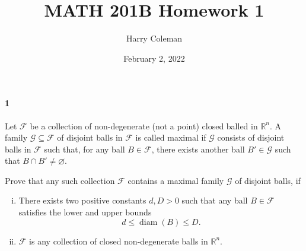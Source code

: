 \documentclass[12pt]{article}
\renewcommand{\maketitle}{\thispagestyle{title}}
\newlength{\myparskip}
\newenvironment{fullbox}{\begin{lrbox}{\savefullbox}\begin{minipage}{\dimexpr\textwidth-2\fboxsep\relax}\setlength{\parskip}{\myparskip}}{\end{minipage}\end{lrbox}\framebox[\textwidth]{\usebox{\savefullbox}}}
\newenvironment{pbox}[1][]{\begin{fullbox}\ifx#1\empty\else\paragraph{#1}\phantom{}\fi}{\end{fullbox}}
\theoremstyle{definition}
\newcommand{\R}{\mathbb{R}}
\renewcommand{\emptyset}{\varnothing}
\newcommand{\<}{\langle}
\renewcommand{\>}{\rangle}
\newcommand{\seq}{\subseteq}
\newcommand{\FF}{\mathcal{F}}
\newcommand{\GG}{\mathcal{G}}
\DeclareMathOperator{\diam}{diam}
\begin{document}
\title{MATH 201B Homework 1}
\author{Harry Coleman}
\date{February 2, 2022}
\maketitle

\begin{pbox}[1]
    Let $\FF$ be a collection of non-degenerate (not a point) closed balled in $\R^n$.
    A family $\GG \seq \FF$ of disjoint balls in $\FF$ is called maximal if $\GG$ consists of disjoint balls in $\FF$ such that, for any ball $B \in \FF$, there exists another ball $B' \in \GG$ such that $B \cap B' \ne \emptyset$.

    Prove that any such collection $\FF$ contains a maximal family $\GG$ of disjoint balls, if
    \begin{enumerate}[(i)]
        \item There exists two positive constants $d, D > 0$ such that any ball $B \in \FF$ satisfies the lower and upper bounds
        \[
            d \leq \diam(B) \leq D.
        \]
        \item $\FF$ is any collection of closed non-degenerate balls in $\R^n$.
    \end{enumerate}

    
\end{pbox}
\end{document}
